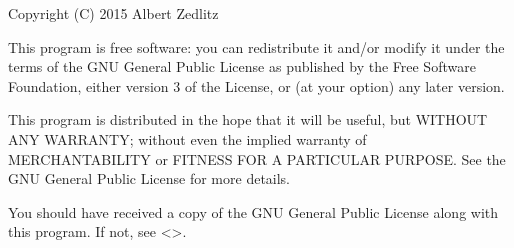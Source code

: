 \documentclass[letterpaper,10pt,english]{sphinxmanual}
\begin{document}
\sphinxAtStartPar
Copyright (C) 2015  Albert Zedlitz

\sphinxAtStartPar
This program is free software: you can redistribute it and/or modify
it under the terms of the GNU General Public License as published by
the Free Software Foundation, either version 3 of the License, or
(at your option) any later version.

\sphinxAtStartPar
This program is distributed in the hope that it will be useful,
but WITHOUT ANY WARRANTY; without even the implied warranty of
MERCHANTABILITY or FITNESS FOR A PARTICULAR PURPOSE.  See the
GNU General Public License for more details.

\sphinxAtStartPar
You should have received a copy of the GNU General Public License
along with this program.  If not, see <>.
\end{document}
